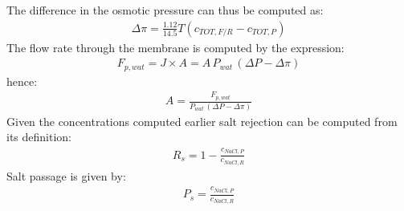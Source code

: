 \documentclass[letterpaper,10pt,english]{jupyterBook}
\begin{document}
\sphinxAtStartPar
The difference in the osmotic pressure can thus be computed as:
\begin{equation*}
\begin{split}
\Delta{\pi}=\frac{1.12}{14.5}T\left(c_{TOT,F/R}-c_{TOT,P}\right)
\end{split}
\end{equation*}
\sphinxAtStartPar
{}
The flow rate through the membrane is computed by the expression:
\begin{equation*}
\begin{split}
F_{p,wat}=J\times{A}=A\,P_{wat}\,\left(\Delta{P}-\Delta{\pi}\right)
\end{split}
\end{equation*}
\sphinxAtStartPar
hence:
\begin{equation*}
\begin{split}
A=\frac{F_{p,wat}}{P_{wat}\,\left(\Delta{P}-\Delta{\pi}\right)}
\end{split}
\end{equation*}
\sphinxAtStartPar
{}
Given the concentrations computed earlier salt rejection can be computed from its definition:
\begin{equation*}
\begin{split}
R_s=1-\frac{c_{NaCl,P}}{c_{NaCl,R}}
\end{split}
\end{equation*}
\sphinxAtStartPar
Salt passage is given by:
\begin{equation*}
\begin{split}
P_s=\frac{c_{NaCl,P}}{c_{NaCl,R}}
\end{split}
\end{equation*}
\end{document}
